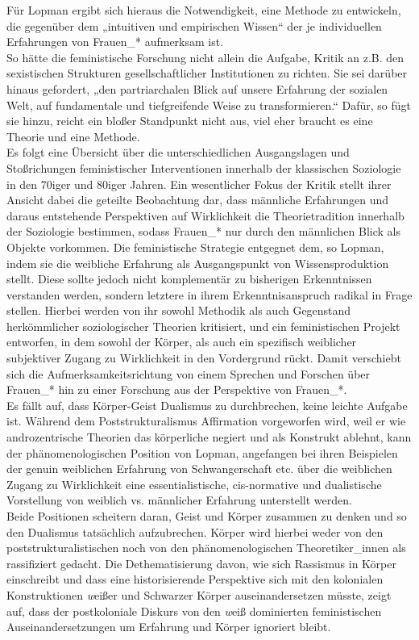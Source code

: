 Für Lopman ergibt sich hieraus die Notwendigkeit, eine Methode zu entwickeln,
die gegenüber dem „intuitiven und empirischen Wissen“\footnotemark
{} der je individuellen
Erfahrungen von Frauen\_* aufmerksam ist.\\
 So hätte die feministische Forschung
nicht allein die Aufgabe, Kritik an z.B. den sexistischen Strukturen
gesellschaftlicher Institutionen zu richten. Sie sei darüber hinaus gefordert,
„den partriarchalen Blick auf unsere Erfahrung der sozialen Welt, auf
fundamentale und tiefgreifende Weise zu transformieren.“ Dafür, so fügt sie
hinzu, reicht ein bloßer Standpunkt nicht aus, viel eher braucht es eine
Theorie und eine Methode.\\
 Es folgt eine Übersicht über die unterschiedlichen
Ausgangslagen und Stoßrichungen feministischer Interventionen innerhalb der
klassischen Soziologie in den 70iger und 80iger Jahren. Ein wesentlicher Fokus
der Kritik stellt ihrer Ansicht dabei die geteilte Beobachtung dar, dass
männliche Erfahrungen und daraus entstehende Perspektiven auf Wirklichkeit die
Theorietradition innerhalb der Soziologie bestimmen, sodass Frauen\_* nur durch
den männlichen Blick als Objekte vorkommen. Die feministische Strategie
entgegnet dem, so Lopman, indem sie die weibliche Erfahrung als Ausgangspunkt
von Wissensproduktion stellt. Diese sollte jedoch nicht komplementär zu
bisherigen Erkenntnissen verstanden werden, sondern letztere in ihrem
Erkenntnisanspruch radikal in Frage stellen. Hierbei werden von ihr sowohl
Methodik als auch Gegenstand herkömmlicher soziologischer Theorien kritisiert,
und ein feministischen Projekt entworfen, in dem sowohl der Körper, als auch
ein spezifisch weiblicher subjektiver Zugang zu Wirklichkeit in den Vordergrund
rückt. Damit verschiebt sich die Aufmerksamkeitsrichtung von einem Sprechen und
Forschen über Frauen\_* hin zu einer Forschung aus der Perspektive von
Frauen\_*.\footnotemark {}\\

\noindent Es fällt auf, dass Körper-Geist Dualismus zu durchbrechen, keine leichte
Aufgabe ist. Während dem Poststrukturalismus Affirmation vorgeworfen wird, weil
er wie androzentrische Theorien das körperliche negiert und als Konstrukt
ablehnt, kann der phänomenologischen Position von Lopman, angefangen bei ihren
Beispielen der genuin weiblichen Erfahrung von Schwangerschaft etc. über die
weiblichen Zugang zu Wirklichkeit eine essentialistische, cis-normative und
dualistische Vorstellung von weiblich vs. männlicher Erfahrung unterstellt
werden. \\
Beide Positionen scheitern daran, Geist und Körper zusammen zu denken
und so den Dualismus tatsächlich aufzubrechen. Körper wird hierbei weder von
den poststrukturalistischen noch von den phänomenologischen Theoretiker\_innen
als rassifiziert gedacht. Die Dethematisierung davon, wie sich Rassismus in
Körper einschreibt und dass eine historisierende Perspektive sich mit den
kolonialen Konstruktionen \textit{w}eißer und Schwarzer Körper auseinandersetzen müsste,
zeigt auf, dass der postkoloniale Diskurs von den \textit{w}eiß dominierten
feministischen Auseinandersetzungen um Erfahrung und Körper ignoriert bleibt.\\

